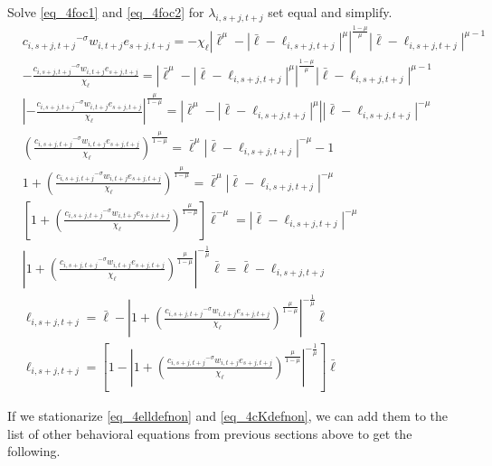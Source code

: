 \documentclass[letterpaper,12pt]{article}
\theoremstyle{definition}
\numberwithin{equation}{section}
\begin{document}
\begin{spacing}{1.5}
	Solve \eqref{eq_4foc1} and \eqref{eq_4foc2} for $\lambda_{i,s+j,t+j}$ set equal and simplify.
	\begin{align}
		 & {c_{i,s+j,t+j}}^{-\sigma} w_{i,t+j} e_{s+j,t+j} =  -\chi_\ell \left| \bar \ell^\mu - |\bar \ell-\ell_{i,s+j,t+j}|^\mu \right|^{\frac{1-\mu}{\mu}}|\bar \ell-\ell_{i,s+j,t+j}|^{\mu-1}  \nonumber \\
		 & - \frac{{c_{i,s+j,t+j}}^{-\sigma} w_{i,t+j} e_{s+j,t+j}}{\chi_\ell} = \left| \bar \ell^\mu - |\bar \ell-\ell_{i,s+j,t+j}|^\mu \right|^{\frac{1-\mu}{\mu}}|\bar \ell-\ell_{i,s+j,t+j}|^{\mu-1} \nonumber \\
		 & \left|-\frac{{c_{i,s+j,t+j}}^{-\sigma} w_{i,t+j} e_{s+j,t+j}}{\chi_\ell} \right|^{\frac{\mu}{1-\mu}} = \left| \bar \ell^\mu - |\bar \ell-\ell_{i,s+j,t+j}|^\mu \right| |\bar \ell-\ell_{i,s+j,t+j}|^{-\mu} \nonumber \\
		 & \left( \frac{{c_{i,s+j,t+j}}^{-\sigma} w_{i,t+j} e_{s+j,t+j}}{\chi_\ell} \right)^{\frac{\mu}{1-\mu}} = \bar \ell^\mu|\bar \ell-\ell_{i,s+j,t+j}|^{-\mu} - 1 \nonumber \\
		 & 1 + \left( \frac{{c_{i,s+j,t+j}}^{-\sigma} w_{i,t+j} e_{s+j,t+j}}{\chi_\ell} \right)^{\frac{\mu}{1-\mu}} = \bar \ell^\mu|\bar \ell-\ell_{i,s+j,t+j}|^{-\mu} \nonumber \\
		 & \left[ 1 + \left( \frac{{c_{i,s+j,t+j}}^{-\sigma} w_{i,t+j} e_{s+j,t+j}}{\chi_\ell} \right)^{\frac{\mu}{1-\mu}} \right] \bar \ell^{-\mu} = |\bar \ell-\ell_{i,s+j,t+j}|^{-\mu} \nonumber \\
		 & \left| 1 + \left( \frac{{c_{i,s+j,t+j}}^{-\sigma} w_{i,t+j} e_{s+j,t+j}}{\chi_\ell} \right)^{\frac{\mu}{1-\mu}} \right|^{-\frac{1}{\mu}} \bar \ell = \bar \ell-\ell_{i,s+j,t+j} \nonumber \\
		 & \ell_{i,s+j,t+j} = \bar \ell - \left| 1 + \left( \frac{{c_{i,s+j,t+j}}^{-\sigma} w_{i,t+j} e_{s+j,t+j}}{\chi_\ell} \right)^{\frac{\mu}{1-\mu}} \right|^{-\frac{1}{\mu}} \bar \ell \nonumber \\
		  & \ell_{i,s+j,t+j} = \left[ 1 - \left| 1 + \left( \frac{{c_{i,s+j,t+j}}^{-\sigma} w_{i,t+j} e_{s+j,t+j}}{\chi_\ell} \right)^{\frac{\mu}{1-\mu}} \right|^{-\frac{1}{\mu}} \right] \bar \ell  \label{eq_4elldefnon}
	\end{align}

	If we stationarize \eqref{eq_4elldefnon} and \eqref{eq_4cKdefnon}, we can add them to the list of other behavioral equations from previous sections above to get the following.


\end{spacing}
\end{document}
